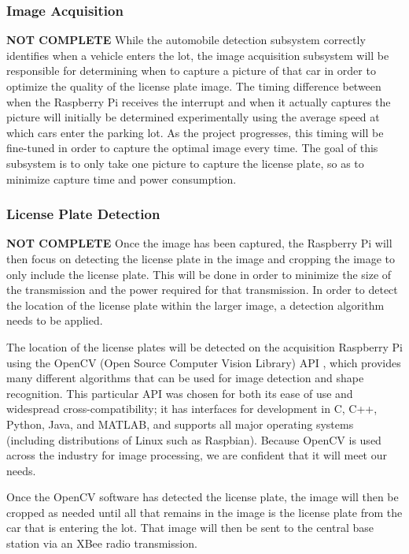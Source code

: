 \documentclass[11pt, oneside, fullpage, doublespace]{article}
\begin{document}
\subsubsection{Image Acquisition}
{\color{red}\textbf{NOT COMPLETE}}
While the automobile detection subsystem correctly identifies when a vehicle enters the lot, the image acquisition subsystem will be responsible for determining when to capture a picture of that car in order to optimize the quality of the license plate image. The timing difference between when the Raspberry Pi receives the interrupt and when it actually captures the picture will initially be determined experimentally using the average speed at which cars enter the parking lot. As the project progresses, this timing will be fine-tuned in order to capture the optimal image every time. The goal of this subsystem is to only take one picture to capture the license plate, so as to minimize capture time and power consumption.

\subsubsection{License Plate Detection}
{\color{red}\textbf{NOT COMPLETE}}
Once the image has been captured, the Raspberry Pi will then focus on detecting the license plate in the image and cropping the image to only include the license plate. This will be done in order to minimize the size of the transmission and the power required for that transmission. In order to detect the location of the license plate within the larger image, a detection algorithm needs to be applied.

The location of the license plates will be detected on the acquisition Raspberry Pi using the OpenCV (Open Source Computer Vision Library) API \cite{openCV}, which provides many different algorithms that can be used for image detection and shape recognition. This particular API was chosen for both its ease of use and widespread cross-compatibility; it has interfaces for development in C, C++, Python, Java, and MATLAB, and supports all major operating systems (including distributions of Linux such as Raspbian). Because OpenCV is used across the industry for image processing, we are confident that it will meet our needs.

Once the OpenCV software has detected the license plate, the image will then be cropped as needed until all that remains in the image is the license plate from the car that is entering the lot. That image will then be sent to the central base station via an XBee radio transmission.
\end{document}

